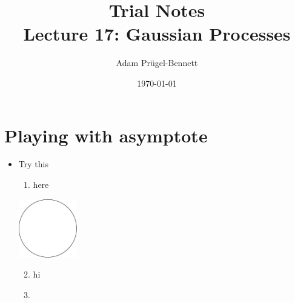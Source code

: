 \documentclass[11pt]{article}
\author{Adam Prügel-Bennett}
\date{\today}
\title{Trial Notes\\\medskip
\large Lecture 17: Gaussian Processes}
\begin{document}
\maketitle

\section{Playing with asymptote}
\label{sec:org3a2a467}
\begin{itemize}
\item Try this
\begin{enumerate}
\item here
\end{enumerate}
\begin{center}
\includegraphics[width=0.2\textwidth]{circle.pdf}
\end{center}
\begin{enumerate}
\setcounter{enumi}{1}
\item hi

\item 
\end{enumerate}
\end{itemize}
\end{document}
